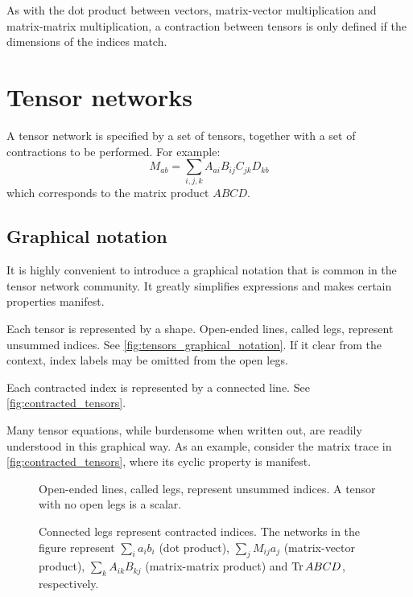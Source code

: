 As with the dot product between vectors, matrix-vector multiplication and
matrix-matrix multiplication, a contraction between tensors is only defined if
the dimensions of the indices match.

\section{Tensor networks}

A tensor network is specified by a set of tensors, together with a set of contractions to be performed. For example:
\begin{equation}
  M_{a b} = \sum_{i, j, k} A_{a i} B_{i j} C_{j k} D_{k b}
\end{equation}
which corresponds to the matrix product $A B C D$.

\subsection{Graphical notation}
It is highly convenient to introduce a graphical notation that is common in the
tensor network community. It greatly simplifies expressions and makes certain
properties manifest.

Each tensor is represented by a shape. Open-ended lines, called legs, represent unsummed
indices. See \autoref{fig:tensors_graphical_notation}. If it clear from the context, index
labels may be omitted from the open legs.

Each contracted index is represented by a connected line. See
\autoref{fig:contracted_tensors}.

Many tensor equations, while burdensome when written out, are readily
understood in this graphical way. As an example, consider the matrix trace in
\autoref{fig:contracted_tensors}, where its cyclic property is manifest.

\begin{figure}
  
  \caption{Open-ended lines, called legs, represent unsummed indices. A tensor
  with no open legs is a scalar.}
  \label{fig:tensors_graphical_notation}
\end{figure}

\begin{figure}
  
  \caption{Connected legs represent contracted indices. The networks in the
  figure represent $\sum_i a_i b_i$ (dot product),
  $\sum_j M_{i j} a_j$ (matrix-vector product), $\sum_{k} A_{i k} B_{k
  j}$ (matrix-matrix product) and $\operatorname{Tr} A B C D$, respectively.}
  \label{fig:contracted_tensors}
\end{figure}

